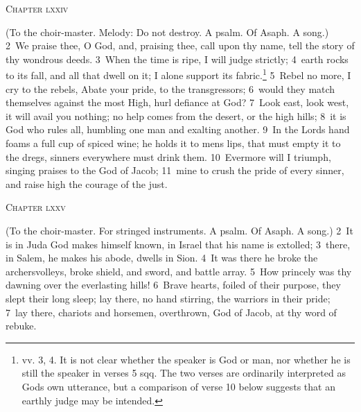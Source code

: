 \documentclass[10pt]{book} %
\begin{document}
\begin{large}\begin{center}\textsc{Chapter lxxiv}\end{center}\end{large}
(To the choir-master. Melody: Do not destroy. A psalm. Of Asaph. A song.)
\textcolor{benred8}{2}~We praise thee, O God, and, praising thee, call upon thy name, tell the story of thy wondrous deeds. \textcolor{benred8}{3}~When the time is ripe, I will judge strictly; \textcolor{benred8}{4}~earth rocks to its fall, and all that dwell on it; I alone support its fabric.\footnote[1]{vv. 3, 4. It is not clear whether the speaker is God or man, nor whether he is still the speaker in verses 5 sqq. The two verses are ordinarily interpreted as God\textquotesingle s own utterance, but a comparison of verse 10 below suggests that an earthly judge may be intended.} \textcolor{benred8}{5}~Rebel no more, I cry to the rebels, Abate your pride, to the transgressors; \textcolor{benred8}{6}~would they match themselves against the most High, hurl defiance at God? \textcolor{benred8}{7}~Look east, look west, it will avail you nothing; no help comes from the desert, or the high hills; \textcolor{benred8}{8}~it is God who rules all, humbling one man and exalting another. \textcolor{benred8}{9}~In the Lord\textquotesingle s hand foams a full cup of spiced wine; he holds it to men\textquotesingle s lips, that must empty it to the dregs, sinners everywhere must drink them. \textcolor{benred8}{10}~Evermore will I triumph, singing praises to the God of Jacob; \textcolor{benred8}{11}~mine to crush the pride of every sinner, and raise high the courage of the just.
\begin{large}\begin{center}\textsc{Chapter lxxv}\end{center}\end{large}
(To the choir-master. For stringed instruments. A psalm. Of Asaph. A song.)
\textcolor{benred8}{2}~It is in Juda God makes himself known, in Israel that his name is extolled; \textcolor{benred8}{3}~there, in Salem, he makes his abode, dwells in Sion. \textcolor{benred8}{4}~It was there he broke the archers\textquotesingle  volleys, broke shield, and sword, and battle array. \textcolor{benred8}{5}~How princely was thy dawning over the everlasting hills! \textcolor{benred8}{6}~Brave hearts, foiled of their purpose, they slept their long sleep; lay there, no hand stirring, the warriors in their pride; \textcolor{benred8}{7}~lay there, chariots and horsemen, overthrown, God of Jacob, at thy word of rebuke.
\end{document}
